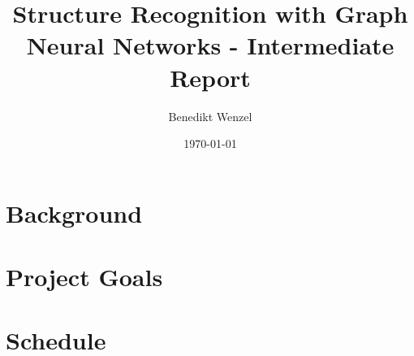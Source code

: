 \documentclass[12pt]{article}
\title{Structure Recognition with Graph Neural Networks - Intermediate Report}
\author{Benedikt Wenzel}
\date{\today}
\begin{document}
\maketitle

\begin{abstract}

\end{abstract}

\section{Background}


\section{Project Goals}


\section{Schedule}


\printbibliography
\end{document}

